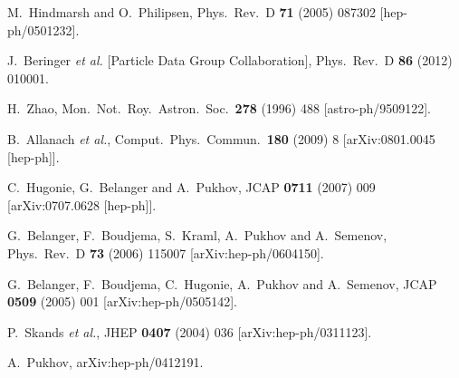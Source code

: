 \documentclass[12pt,a4paper]{article}
\begin{document}
\begin{thebibliography}{}
  M.~Hindmarsh and O.~Philipsen,
  Phys.\ Rev.\ D {\bf 71} (2005) 087302
  [hep-ph/0501232].


  J.~Beringer {\it et al.}  [Particle Data Group Collaboration],
  Phys.\ Rev.\ D {\bf 86} (2012) 010001.

  H.~Zhao,
  Mon.\ Not.\ Roy.\ Astron.\ Soc.\  {\bf 278} (1996) 488
  [astro-ph/9509122].


  B.~Allanach {\it et al.},
  Comput.\ Phys.\ Commun.\  {\bf 180} (2009) 8
  [arXiv:0801.0045 [hep-ph]].

  C.~Hugonie, G.~Belanger and A.~Pukhov,
  JCAP {\bf 0711} (2007) 009
  [arXiv:0707.0628 [hep-ph]].






  G.~Belanger, F.~Boudjema, S.~Kraml, A.~Pukhov and A.~Semenov,
  Phys.\ Rev.\  D {\bf 73} (2006) 115007
  [arXiv:hep-ph/0604150].



  G.~Belanger, F.~Boudjema, C.~Hugonie, A.~Pukhov and A.~Semenov,
  JCAP {\bf 0509} (2005) 001
  [arXiv:hep-ph/0505142].




  P.~Skands {\it et al.},
  JHEP {\bf 0407} (2004) 036
  [arXiv:hep-ph/0311123].




  A.~Pukhov,
  arXiv:hep-ph/0412191.


\end{thebibliography}
\end{document}
